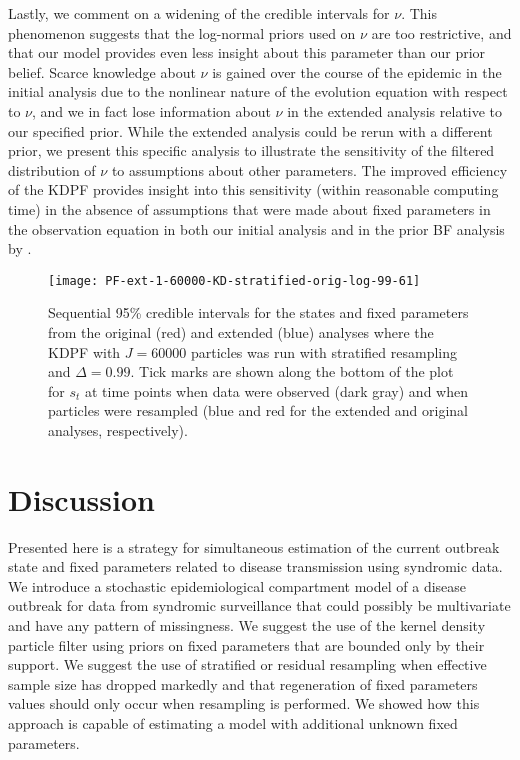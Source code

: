 \documentclass{elsarticle}
\begin{document}
Lastly, we comment on a widening of the credible intervals for $\nu$. This phenomenon suggests that the log-normal priors used on $\nu$ are too restrictive, and that our model provides even less insight about this parameter than our prior belief. Scarce knowledge about $\nu$ is gained over the course of the epidemic in the initial analysis due to the nonlinear nature of the evolution equation with respect to $\nu$, and we in fact lose information about $\nu$ in the extended analysis relative to our specified prior. While the extended analysis could be rerun with a different prior, we present this specific analysis to illustrate the sensitivity of the filtered distribution of $\nu$ to assumptions about other parameters. The improved efficiency of the KDPF provides insight into this sensitivity (within reasonable computing time) in the absence of assumptions that were made about fixed parameters in the observation equation in both our initial analysis and in the prior BF analysis by \citet{skvortsov2012monitoring}.

\begin{figure}
\centering
\texttt{[image: PF-ext-1-60000-KD-stratified-orig-log-99-61]}
\caption{Sequential 95\% credible intervals for the states and fixed parameters from the original (red) and extended (blue) analyses where the KDPF with $J = 60000$ particles was run with stratified resampling and $\Delta = 0.99$. Tick marks are shown along the bottom of the plot for $s_t$ at time points when data were observed (dark gray) and when particles were resampled (blue and red for the extended and original analyses, respectively).} \label{fig:ext}
\end{figure}

\section{Discussion \label{sec:discussion}}

Presented here is a strategy for simultaneous estimation of the current outbreak state and fixed parameters related to disease transmission using syndromic data. We introduce a stochastic epidemiological compartment model of a disease outbreak for data from syndromic surveillance that could possibly be multivariate and have any pattern of missingness. We suggest the use of the kernel density particle filter \citep{Liu:West:comb:2001} using priors on fixed parameters that are bounded only by their support. We suggest the use of stratified or residual resampling when effective sample size has dropped markedly and that regeneration of fixed parameters values should only occur when resampling is performed. We showed how this approach is capable of estimating a model with additional unknown fixed parameters.
\end{document}
